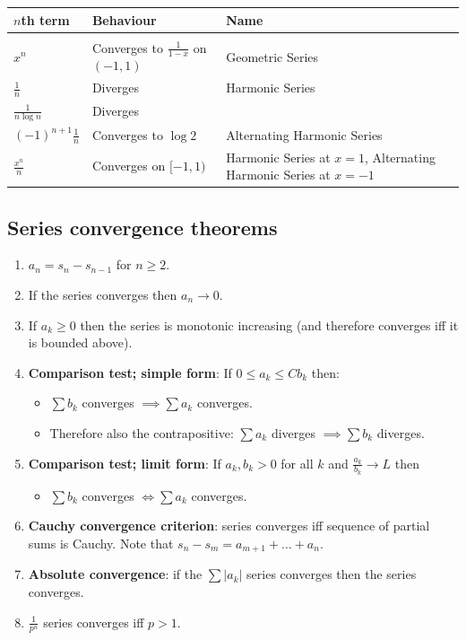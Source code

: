 \begin{tabular}{l|l|l}
  $n$th term             & Behaviour                                   & Name          \\[5pt]
  \hline&&\\
  $x^n$                  & Converges to $\frac{1}{1 - x}$ on $(-1, 1)$ & Geometric Series\\[5pt]
  $\frac{1}{n}$          & Diverges                                    & Harmonic Series \\[5pt]
  $\frac{1}{n\log n}$    & Diverges                                    &                 \\[5pt]
  $(-1)^{n+1}\frac{1}{n}$ & Converges to $\log 2$              & Alternating Harmonic Series \\[5pt]
  $\frac{x^n}{n}$        & Converges on $[-1, 1)$                      & Harmonic Series at $x=1$, Alternating Harmonic Series at $x=-1$\\[5pt]
\end{tabular}

\subsection{Series convergence theorems}
\begin{theorem*}\hspace{0pt}
  \begin{enumerate}[label=(\roman*)]
  \item $a_n = s_n - s_{n-1}$ for $n \geq 2$.
  \item If the series converges then $a_n \to 0$.
  \item If $a_k \geq 0$ then the series is monotonic increasing (and therefore converges iff it is bounded above).
  \item {\bf Comparison test; simple form}: If $0 \leq a_k \leq Cb_k$ then:
    \begin{itemize}
    \item $\sum b_k$ converges $\implies \sum a_k$ converges.
    \item Therefore also the contrapositive: $\sum a_k$ diverges $\implies \sum b_k$ diverges.
    \end{itemize}
  \item {\bf Comparison test; limit form}: If $a_k, b_k > 0$ for all $k$ and
    $\frac{a_k}{b_k} \to L$ then
    \begin{itemize}
    \item $\sum b_k$ converges $\iff \sum a_k$ converges.
    \end{itemize}
  \item {\bf Cauchy convergence criterion}: series converges iff sequence of partial sums is
    Cauchy. Note that $s_n - s_m = a_{m+1} + \ldots + a_n$.
  \item {\bf Absolute convergence}: if the $\sum |a_k|$ series converges then the series converges.
  \item $\frac{1}{p^n}$ series converges iff $p > 1$.
  \end{enumerate}
\end{theorem*}

